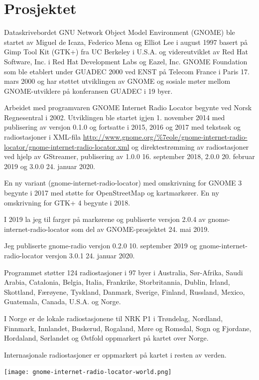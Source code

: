 \documentclass[a4paper,norsk,utf8]{report}
\begin{document}
\section*{Prosjektet}
Dataskrivebordet GNU Network Object Model Environment (GNOME) ble
startet av Miguel de Icaza, Federico Mena og Elliot Lee i august 1997
basert på Gimp Tool Kit (GTK+) fra UC Berkeley i U.S.A. og videreutviklet
av Red Hat Software, Inc. i Red Hat Development Labs og Eazel, Inc.
GNOME Foundation som ble etablert under GUADEC 2000 ved ENST på
Telecom France i Paris 17. mars 2000 og har støttet utviklingen av
GNOME og sosiale møter mellom GNOME-utviklere på konferansen GUADEC i
19 byer.

Arbeidet med programvaren GNOME Internet Radio Locator begynte ved
Norsk Regnesentral i 2002.  Utviklingen ble startet igjen 1. november
2014 med publisering av versjon 0.1.0 og fortsatte i 2015, 2016 og
2017 med tekstsøk og radiostasjoner i XML-fila
\url{http://www.gnome.org/%7eole/gnome-internet-radio-locator/gnome-internet-radio-locator.xml}
  og direktestrømming av radiostasjoner ved hjelp av GStreamer,
  publisering av 1.0.0 16. september 2018, 2.0.0 20. februar 2019 og 3.0.0 24. januar 2020.

En ny variant (gnome-internet-radio-locator) med omskrivning for GNOME
3 begynte i 2017 med støtte for OpenStreetMap og kartmarkører.  En ny
omskrivning for GTK+ 4 begynte i 2018.

I 2019 la jeg til farger på markørene og publiserte versjon 2.0.4 av
gnome-internet-radio-locator som del av GNOME-prosjektet 24. mai 2019.

Jeg publiserte gnome-radio versjon 0.2.0 10. september 2019 og
gnome-internet-radio-locator versjon 3.0.1 24. januar 2020.

Programmet støtter 124 radiostasjoner i 97 byer i Australia,
Sør-Afrika, Saudi Arabia, Catalonia, Belgia, Italia, Frankrike,
Storbritannia, Dublin, Irland, Skottland, Færøyene, Tyskland, Danmark,
Sverige, Finland, Russland, Mexico, Guatemala, Canada, U.S.A. og Norge.

I Norge er de lokale radiostasjonene til NRK P1 i Trøndelag, Nordland,
Finnmark, Innlandet, Buskerud, Rogaland, Møre og Romsdal, Sogn og Fjordane,
Hordaland, Sørlandet og Østfold oppmarkert på kartet over Norge.

Internasjonale radiostasjoner er oppmarkert på kartet i resten av verden.

\begin{center}
\colorbox{white}{\texttt{[image: gnome-internet-radio-locator-world.png]}}
\end{center}
\end{document}
